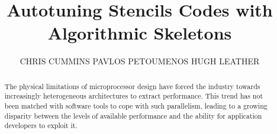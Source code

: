 \documentclass[prodmode,acmtecs]{acmsmall} %
\begin{document}

\title{Autotuning Stencils Codes with Algorithmic Skeletons}

\author{CHRIS CUMMINS
PAVLOS PETOUMENOS
HUGH LEATHER
}

%
%


\begin{abstract}
The physical limitations of microprocessor design have forced the
industry towards increasingly heterogeneous architectures to extract
performance. This trend has not been matched with software tools to
cope with such parallelism, leading to a growing disparity between the
levels of available performance and the ability for application
developers to exploit it.



\end{abstract}
\end{document}

